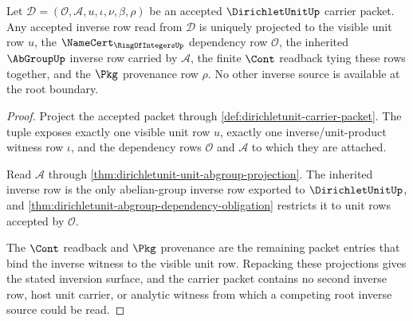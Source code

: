 \begin{theorem}
\label{thm:dirichletunit-root-inverse-row-inversion}
Let $\mathcal{D}=(\mathcal{O},\mathcal{A},u,\iota,\nu,\beta,\rho)$ be an accepted $\DirichletUnitUp$ carrier packet. Any accepted inverse row read from $\mathcal{D}$ is uniquely projected to the visible unit row $u$, the $\NameCert_{\RingOfIntegersUp}$ dependency row $\mathcal{O}$, the inherited $\AbGroupUp$ inverse row carried by $\mathcal{A}$, the finite $\Cont$ readback tying these rows together, and the $\Pkg$ provenance row $\rho$. No other inverse source is available at the root boundary.
\end{theorem}
\begin{proof}
Project the accepted packet through \autoref{def:dirichletunit-carrier-packet}. The tuple exposes exactly one visible unit row $u$, exactly one inverse/unit-product witness row $\iota$, and the dependency rows $\mathcal{O}$ and $\mathcal{A}$ to which they are attached.

Read $\mathcal{A}$ through \autoref{thm:dirichletunit-unit-abgroup-projection}. The inherited inverse row is the only abelian-group inverse row exported to $\DirichletUnitUp$, and \autoref{thm:dirichletunit-abgroup-dependency-obligation} restricts it to unit rows accepted by $\mathcal{O}$.

The $\Cont$ readback and $\Pkg$ provenance are the remaining packet entries that bind the inverse witness to the visible unit row. Repacking these projections gives the stated inversion surface, and the carrier packet contains no second inverse row, host unit carrier, or analytic witness from which a competing root inverse source could be read.
\end{proof}

